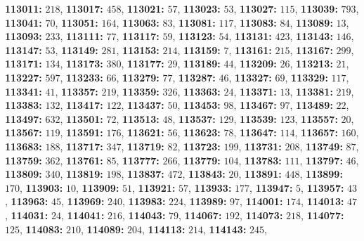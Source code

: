 \textsf{\bfseries 113011:} $218$, \textsf{\bfseries 113017:} $458$, \textsf{\bfseries 113021:} $57$, \textsf{\bfseries 113023:} $53$, \textsf{\bfseries 113027:} $115$, \textsf{\bfseries 113039:} $793$, \textsf{\bfseries 113041:} $70$, \textsf{\bfseries 113051:} $164$, \textsf{\bfseries 113063:} $83$, \textsf{\bfseries 113081:} $117$, \textsf{\bfseries 113083:} $84$, \textsf{\bfseries 113089:} $13$, \textsf{\bfseries 113093:} $233$, \textsf{\bfseries 113111:} $77$, \textsf{\bfseries 113117:} $59$, \textsf{\bfseries 113123:} $54$, \textsf{\bfseries 113131:} $423$, \textsf{\bfseries 113143:} $146$, \textsf{\bfseries 113147:} $53$, \textsf{\bfseries 113149:} $281$, \textsf{\bfseries 113153:} $214$, \textsf{\bfseries 113159:} $7$, \textsf{\bfseries 113161:} $215$, \textsf{\bfseries 113167:} $299$, \textsf{\bfseries 113171:} $134$, \textsf{\bfseries 113173:} $380$, \textsf{\bfseries 113177:} $29$, \textsf{\bfseries 113189:} $44$, \textsf{\bfseries 113209:} $26$, \textsf{\bfseries 113213:} $21$, \textsf{\bfseries 113227:} $597$, \textsf{\bfseries 113233:} $66$, \textsf{\bfseries 113279:} $77$, \textsf{\bfseries 113287:} $46$, \textsf{\bfseries 113327:} $69$, \textsf{\bfseries 113329:} $117$, \textsf{\bfseries 113341:} $41$, \textsf{\bfseries 113357:} $219$, \textsf{\bfseries 113359:} $326$, \textsf{\bfseries 113363:} $24$, \textsf{\bfseries 113371:} $13$, \textsf{\bfseries 113381:} $219$, \textsf{\bfseries 113383:} $132$, \textsf{\bfseries 113417:} $122$, \textsf{\bfseries 113437:} $50$, \textsf{\bfseries 113453:} $98$, \textsf{\bfseries 113467:} $97$, \textsf{\bfseries 113489:} $22$, \textsf{\bfseries 113497:} $632$, \textsf{\bfseries 113501:} $72$, \textsf{\bfseries 113513:} $48$, \textsf{\bfseries 113537:} $129$, \textsf{\bfseries 113539:} $123$, \textsf{\bfseries 113557:} $20$, \textsf{\bfseries 113567:} $119$, \textsf{\bfseries 113591:} $176$, \textsf{\bfseries 113621:} $56$, \textsf{\bfseries 113623:} $78$, \textsf{\bfseries 113647:} $114$, \textsf{\bfseries 113657:} $160$, \textsf{\bfseries 113683:} $188$, \textsf{\bfseries 113717:} $347$, \textsf{\bfseries 113719:} $82$, \textsf{\bfseries 113723:} $199$, \textsf{\bfseries 113731:} $208$, \textsf{\bfseries 113749:} $87$, \textsf{\bfseries 113759:} $362$, \textsf{\bfseries 113761:} $85$, \textsf{\bfseries 113777:} $266$, \textsf{\bfseries 113779:} $104$, \textsf{\bfseries 113783:} $111$, \textsf{\bfseries 113797:} $46$, \textsf{\bfseries 113809:} $340$, \textsf{\bfseries 113819:} $198$, \textsf{\bfseries 113837:} $472$, \textsf{\bfseries 113843:} $20$, \textsf{\bfseries 113891:} $448$, \textsf{\bfseries 113899:} $170$, \textsf{\bfseries 113903:} $10$, \textsf{\bfseries 113909:} $51$, \textsf{\bfseries 113921:} $57$, \textsf{\bfseries 113933:} $177$, \textsf{\bfseries 113947:} $5$, \textsf{\bfseries 113957:} $43$, \textsf{\bfseries 113963:} $45$, \textsf{\bfseries 113969:} $240$, \textsf{\bfseries 113983:} $224$, \textsf{\bfseries 113989:} $97$, \textsf{\bfseries 114001:} $174$, \textsf{\bfseries 114013:} $47$, \textsf{\bfseries 114031:} $24$, \textsf{\bfseries 114041:} $216$, \textsf{\bfseries 114043:} $79$, \textsf{\bfseries 114067:} $192$, \textsf{\bfseries 114073:} $218$, \textsf{\bfseries 114077:} $125$, \textsf{\bfseries 114083:} $210$, \textsf{\bfseries 114089:} $204$, \textsf{\bfseries 114113:} $214$, \textsf{\bfseries 114143:} $245$, 
